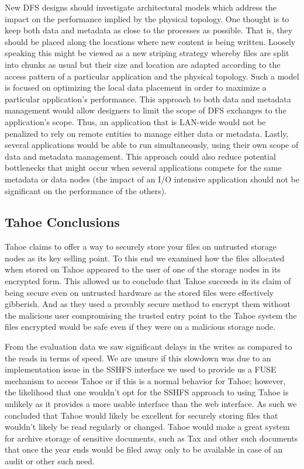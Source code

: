 \documentclass[11pt]{article}
\begin{document}
New DFS designs should investigate architectural models which address the impact 
on the performance implied by the physical topology. One thought is to keep both 
data and metadata as close to the processes as possible. That is, they should be 
placed along the locations where new content is being written. Loosely speaking this 
might be viewed as a new striping strategy whereby files are split into chunks as 
usual but their size and location are adapted according to the access pattern of a 
particular application and the physical topology. Such a model is focused on 
optimizing the local data placement in order to maximize a particular application’s 
performance. This approach to both data and metadata management would allow designers 
to limit the scope of DFS exchanges to the application’s scope. Thus, an application 
that is LAN-wide would not be penalized to rely on remote entities to manage either 
data or metadata. Lastly, several applications would be able to run simultaneously, 
using their own scope of data and metadata management. This approach could also reduce 
potential bottlenecks that might occur when several applications compete for the same 
metadata or data nodes (the impact of an I/O intensive application should not be 
significant on the performance of the others).

\subsection{Tahoe Conclusions}

Tahoe claims to offer a way to securely store your files on untrusted
storage nodes as its key selling point. To this end we examined how
the files allocated when stored on Tahoe appeared to the user of one
of the storage nodes in its encrypted form. This allowed us to
conclude that Tahoe succeeds in its claim of being secure even on
untrusted hardware as the stored files were effectively gibberish. And
as they used a provably secure method to encrypt them without the
malicious user compromising the trusted entry point to the Tahoe
system the files encrypted would be safe even if they were on a
malicious storage node.

From the evaluation data we saw significant delays in the writes as
compared to the reads in terms of speed. We are unsure if this
slowdown was due to an implementation issue in the SSHFS interface we
used to provide us a FUSE mechanism to access Tahoe or if this is a
normal behavior for Tahoe; however, the likelihood that one wouldn't
opt for the SSHFS approach to using Tahoe is unlikely as it provides a
more usable interface than the web interface. As such we concluded
that Tahoe would likely be excellent for securely storing files that
wouldn't likely be read regularly or changed. Tahoe would make a great
system for archive storage of sensitive documents, such as Tax and
other such documents that once the year ends would be filed away only
to be available in case of an audit or other such need.
\end{document}
